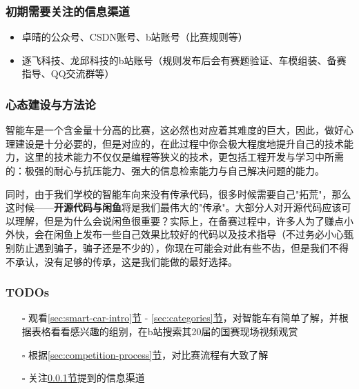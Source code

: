 \documentclass[a4paper,12pt]{article}
\begin{document}
\subsubsection{初期需要关注的信息渠道}
\label{sec:info-channels}

\begin{itemize}
    \item 卓晴的公众号、CSDN账号、b站账号（比赛规则等）
    \item 逐飞科技、龙邱科技的b站账号（规则发布后会有赛题验证、车模组装、备赛指导、QQ交流群等）
\end{itemize}

\subsubsection{心态建设与方法论}

智能车是一个含金量十分高的比赛，这必然也对应着其难度的巨大，因此，做好心理建设是十分必要的，但是对应的，在此过程中你会极大程度地提升自己的技术能力，这里的技术能力不仅仅是编程等狭义的技术，更包括工程开发与学习中所需的：极强的耐心与抗压能力、强大的信息检索能力与自己解决问题的能力。

同时，由于我们学校的智能车向来没有传承代码，很多时候需要自己"拓荒"，那么这时候——\textbf{开源代码与闲鱼}将是我们最伟大的"传承"。大部分人对开源代码应该可以理解，但是为什么会说闲鱼很重要？实际上，在备赛过程中，许多人为了赚点小外快，会在闲鱼上发布一些自己效果比较好的代码以及技术指导（不过务必小心甄别防止遇到骗子，骗子还是不少的），你现在可能会对此有些不齿，但是我们不得不承认，没有足够的传承，这是我们能做的最好选择。

\subsubsection{TODOs}

\begin{todobox}
\begin{itemize}
    \item[$\square$] 观看\hyperref[sec:smart-car-intro]{\ref*{sec:smart-car-intro}节} - \hyperref[sec:categories]{\ref*{sec:categories}节}，对智能车有简单了解，并根据表格看看感兴趣的组别，在b站搜索其20届的国赛现场视频观赏
    \item[$\square$] 根据\hyperref[sec:competition-process]{\ref*{sec:competition-process}节}，对比赛流程有大致了解
    \item[$\square$] 关注\hyperref[sec:info-channels]{\ref*{sec:info-channels}节}提到的信息渠道
\end{itemize}
\end{todobox}
\end{document}
